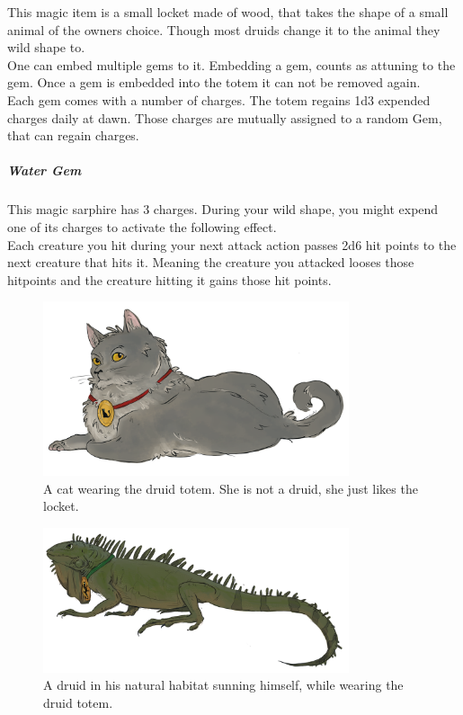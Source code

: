 \documentclass[letter,10pt,twocolumn,openany]{dndbook}
\begin{document}

This magic item is a small locket made of wood, that takes the shape of a small animal of the owners choice.
Though most druids change it to the animal they wild shape to.\\

One can embed multiple gems to it.
Embedding a gem, counts as attuning to the gem.
Once a gem is embedded into the totem it can not be removed again.\\

Each gem comes with a number of charges.
The totem regains 1d3 expended charges daily at dawn.
Those charges are mutually assigned to a random Gem, that can regain charges.\\

\subparagraph{Water Gem} This magic sarphire has 3 charges. During your wild shape, you might expend one of its charges to activate the following effect.\\
Each creature you hit during your next attack action passes 2d6 hit points to the next creature that hits it. Meaning the creature you attacked looses those hitpoints and the creature hitting it gains those hit points.\\

\begin{figure}
    \includegraphics[width=9cm]{images/cat.png}
    \caption{A cat wearing the druid totem. She is not a druid, she just likes the locket.}
\end{figure}

\begin{figure}
    \includegraphics[width=9cm]{images/iguana.png}
    \caption{A druid in his natural habitat sunning himself, while wearing the druid totem.}
\end{figure}
\end{document}
